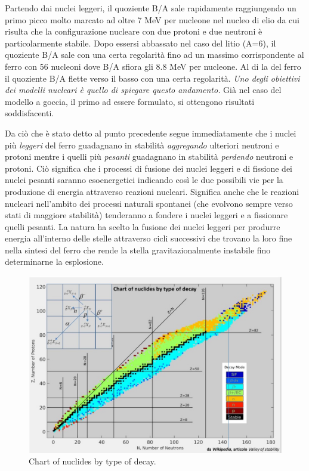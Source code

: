 Partendo dai nuclei leggeri, il quoziente B/A sale rapidamente raggiungendo un primo picco molto marcato ad oltre 7 MeV
per nucleone nel nucleo di elio da cui risulta che la configurazione nucleare con due protoni e due neutroni è
particolarmente stabile.
Dopo essersi abbassato nel caso del litio (A=6), il quoziente B/A sale con una certa regolarità fino ad un massimo
corrispondente al ferro con 56 nucleoni dove B/A sfiora gli 8.8 MeV per nucleone.
Al di la del ferro il quoziente B/A flette verso il basso con una certa regolarità.
\emph{Uno degli obiettivi dei modelli nucleari è quello di spiegare questo andamento.}
Già nel caso del modello a goccia, il primo ad essere formulato, si ottengono risultati soddisfacenti.

Da ciò che è stato detto al punto precedente segue immediatamente che i nuclei più \emph{leggeri} del ferro guadagnano in
stabilità \emph{aggregando} ulteriori neutroni e protoni mentre i quelli più \emph{pesanti} guadagnano in stabilità 
\emph{perdendo} neutroni e protoni.
Ciò significa che i processi di fusione dei nuclei leggeri e di fissione dei nuclei pesanti saranno esoenergetici
indicando così le due possibili vie per la produzione di energia attraverso reazioni nucleari.
Significa anche che le reazioni nucleari nell’ambito dei processi naturali spontanei (che evolvono sempre verso stati
di maggiore stabilità) tenderanno a fondere i nuclei leggeri e a fissionare quelli pesanti.
La natura ha scelto la fusione dei nuclei leggeri per produrre energia all’interno delle stelle attraverso cicli
successivi che trovano la loro fine nella sintesi del ferro che rende la stella gravitazionalmente instabile fino
determinarne la esplosione.

\begin{figure}
    \centering
    \includegraphics{../figs/nuclides-chart-decay}
    \caption{Chart of nuclides by type of decay.}
    \label{fig:nuclides-chart-decay}
\end{figure}

